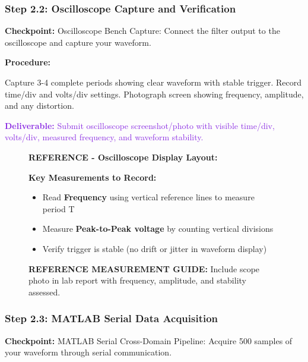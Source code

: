 \documentclass[11pt,letterpaper]{article}
\providecommand{\cpECE}[1]{\textcolor{OliveGreen}{\textbf{Checkpoint:} #1}}
\providecommand{\delECE}[1]{\textcolor{BlueViolet}{\textbf{Deliverable:} #1}}
\begin{document}
\subsubsection{Step 2.2: Oscilloscope Capture and Verification}
\cpECE{Oscilloscope Bench Capture:} Connect the filter output to the oscilloscope and capture your waveform.

\textbf{Procedure:}

Capture 3-4 complete periods showing clear waveform with stable trigger. Record time/div and volts/div settings. Photograph screen showing frequency, amplitude, and any distortion.

\delECE{Submit oscilloscope screenshot/photo with visible time/div, volts/div, measured frequency, and waveform stability.}

\begin{figure}[H]
    \centering
    \vspace{0.5in}
    \textbf{REFERENCE - Oscilloscope Display Layout:}

    
    \vspace{0.3in}
    \textbf{Key Measurements to Record:}
    \begin{itemize}
        \item Read \textbf{Frequency} using vertical reference lines to measure period T
        \item Measure \textbf{Peak-to-Peak voltage} by counting vertical divisions
        \item Verify trigger is stable (no drift or jitter in waveform display)
    \end{itemize}
    
    \vspace{0.5in}
    \caption{\textbf{REFERENCE MEASUREMENT GUIDE:} Include scope photo in lab report with frequency, amplitude, and stability assessed.}
    \label{fig:scope_waveform}
\end{figure}


\subsubsection{Step 2.3: MATLAB Serial Data Acquisition}
\cpECE{MATLAB Serial Cross-Domain Pipeline:} Acquire 500 samples of your waveform through serial communication.
\end{document}
